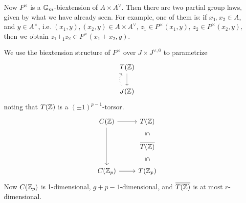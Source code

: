 Now $P^\times$ is a $\mathbb{G}_m$-biextension of $A \times A^\vee$. Then there are two partial group laws, given by what we have already seen. For example, one of them is: if $x_1,x_2 \in A$, and $y \in A^\times$, i.e. $(x_1,y),(x_2,y) \in A \times A^\vee$, $z_1 \in P^\times(x_1,y)$, $z_2 \in P^\times(x_2,y)$, then we obtain $z_1 +_1 z_2 \in P^\times(x_1+x_2,y)$. 


We use the biextension structure of $P^\times$ over $J \times J^{\vee,0}$ to parametrize 
	\[
	\begin{tikzcd}
	T(\Z) \arrow{d} \\
	J(\Z) \arrow[bend left=40, dotted]{u}
	\end{tikzcd}
	\]
noting that $T(\mathbb{Z})$ is a $(\pm 1)^{p-1}$-torsor. 
	\[
	\begin{tikzcd}
	C(\Z) \arrow{dd} \arrow{r} & T(\Z) \arrow[draw=none]{d}[sloped,auto=false]{\subseteq} \\
	& \ov{T(\Z)} \arrow[draw=none]{d}[sloped,auto=false]{\subseteq} \\
	C(\Z_p) \arrow{r} & T(\Z_p) 
	\end{tikzcd}
	\]
Now $C(\mathbb{Z}_p)$ is 1-dimensional, $g+p-1$-dimensional, and $\overline{T(\mathbb{Z})}$ is at most $r$-dimensional. 

















 